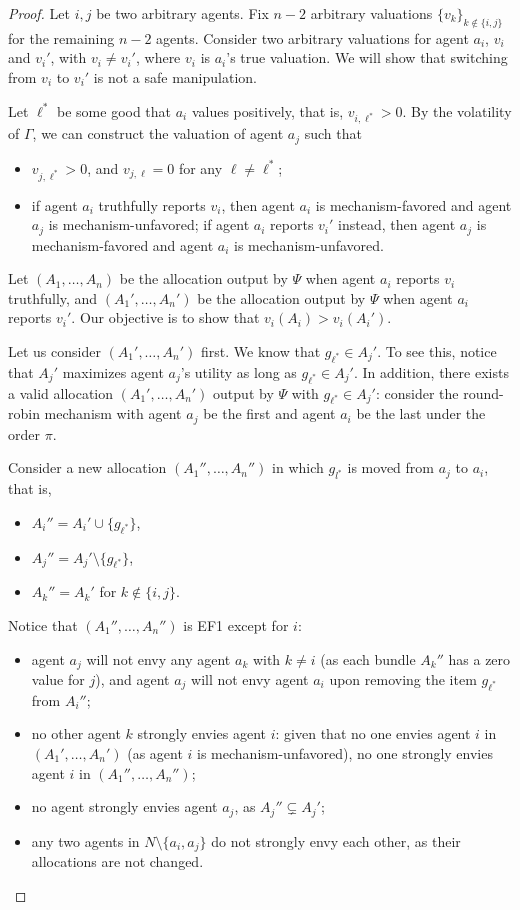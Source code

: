 \begin{proof}
Let $i,j$ be two arbitrary agents.
Fix $n-2$ arbitrary valuations $\{v_k\}_{k\notin\{i,j\}}$ for the remaining $n-2$ agents.
Consider two arbitrary valuations for agent $a_i$, $v_i$ and $v_i'$, with $v_i\neq v_i'$, where $v_i$ is $a_i$'s true valuation.
We will show that switching from $v_i$ to $v_i'$ is not a safe manipulation.

Let $\ell^\ast$ be some good that $a_i$ values positively, that is, $v_{i,\ell^\ast}>0$.
By the volatility of $\Gamma$, we can construct the valuation of agent $a_j$ such that 
\begin{itemize}
    \item $v_{j,\ell^\ast}>0$, and $v_{j,\ell}=0$ for any $\ell\neq\ell^\ast$;
    \item if agent $a_i$ truthfully reports $v_i$, then agent $a_i$ is mechanism-favored and agent $a_j$ is mechanism-unfavored; if agent $a_i$ reports $v_i'$ instead, then agent $a_j$ is mechanism-favored and agent $a_i$ is mechanism-unfavored.
\end{itemize}

Let $(A_1,\ldots,A_n)$ be the allocation output by $\Psi$ when agent $a_i$ reports $v_i$ truthfully, and $(A_1',\ldots,A_n')$ be the allocation output by $\Psi$ when agent $a_i$ reports $v_i'$.
Our objective is to show that $v_i(A_i)>v_i(A_i')$.

Let us consider $(A_1',\ldots,A_n')$ first.
We know that $g_{\ell^\ast}\in A_j'$.
To see this, notice that $A_j'$ maximizes agent $a_j$'s utility as long as $g_{\ell^\ast}\in A_j'$.
In addition, there exists a valid allocation $(A_1',\ldots,A_n')$ output by $\Psi$ with $g_{\ell^\ast}\in A_j'$: consider the round-robin mechanism with agent $a_j$ be the first and agent $a_i$ be the last under the order $\pi$.

Consider a new allocation $(A_1'',\ldots,A_n'')$ in which $g_{l^*}$ is moved from $a_j$ to $a_i$, that is,
\begin{itemize}
\item $A_i''=A_i'\cup\{g_{\ell^\ast}\}$,
\item $A_j''=A_j'\setminus\{g_{\ell^\ast}\}$,
\item $A_k''=A_k'$ for $k\notin\{i,j\}$.
\end{itemize}
Notice that $(A_1'',\ldots,A_n'')$ is EF1 except for $i$: 
\begin{itemize}
    \item agent $a_j$ will not envy any agent $a_k$ with $k\neq i$ (as each bundle $A_k''$ has a zero value for $j$), and agent $a_j$ will not envy agent $a_i$ upon removing the item $g_{\ell^\ast}$ from $A_i''$;
    \item no other agent $k$ strongly envies agent $i$: given that no one envies agent $i$ in $(A_1',\ldots,A_n')$ (as agent $i$ is mechanism-unfavored), no one strongly envies agent $i$ in $(A_1'',\ldots,A_n'')$;
    \item no agent strongly envies agent $a_j$, as $A_j''\subsetneq A_j'$;
    \item any two agents in $N\setminus\{a_i,a_j\}$ do not strongly envy each other, as their allocations are not changed.
\end{itemize}


\end{proof}
